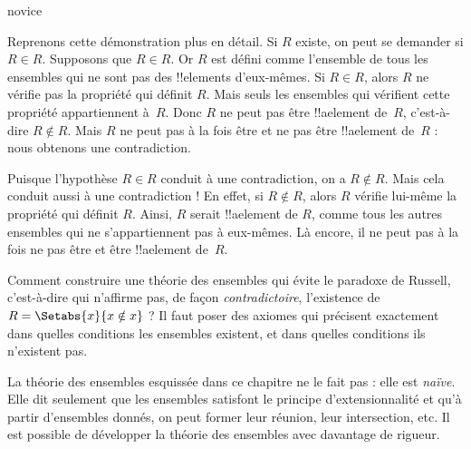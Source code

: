 \documentclass[../../../include/open-logic-section]{subfiles}
\begin{document}
\begin{tagblock}{novice}
\begin{explain}
Reprenons cette démonstration plus en détail.
Si $R$ existe, on peut se demander si $R \in R$.
Supposons que $R \in R$. Or $R$ est défini comme
l'ensemble de tous les ensembles qui ne sont pas des
!!{element}s d'eux-mêmes. Si $R \in R$, alors $R$ ne vérifie
pas la propriété qui définit $R$. Mais seuls les ensembles
qui vérifient cette propriété appartiennent à~$R$.
Donc $R$ ne peut pas être !!a{element} de~$R$,
c'est-à-dire $R \notin R$. Mais $R$ ne peut pas à la fois
être et ne pas être !!a{element} de~$R$ :
nous obtenons une contradiction.

Puisque l'hypothèse $R \in R$ conduit à une contradiction,
on a $R \notin R$. Mais cela conduit aussi à une contradiction !{}
En effet, si $R \notin R$, alors $R$ vérifie lui-même
la propriété qui définit $R$. Ainsi, $R$ serait !!a{element} de $R$,
comme tous les autres ensembles qui ne s'appartiennent pas
à eux-mêmes. Là encore, il ne peut pas à la fois
ne pas être et être !!a{element} de~$R$.
\end{explain}
\end{tagblock}

\begin{digress}
Comment construire une théorie des ensembles qui évite
le paradoxe de Russell, c'est-à-dire qui n'affirme pas,
de façon \emph{contradictoire}, l'existence de
$R = \Setabs{x}{x \notin x}$ ?
Il faut poser des axiomes qui précisent exactement
dans quelles conditions les ensembles existent,
et dans quelles conditions ils n'existent pas.

La théorie des ensembles esquissée dans ce chapitre
ne le fait pas : elle est \emph{naïve}.
Elle dit seulement que les ensembles satisfont le principe
d'extensionnalité et qu'à partir d'ensembles donnés, on peut
former leur réunion, leur intersection, etc.
Il est possible de développer la théorie des ensembles
avec davantage de rigueur. 
\end{digress}
\end{document}
